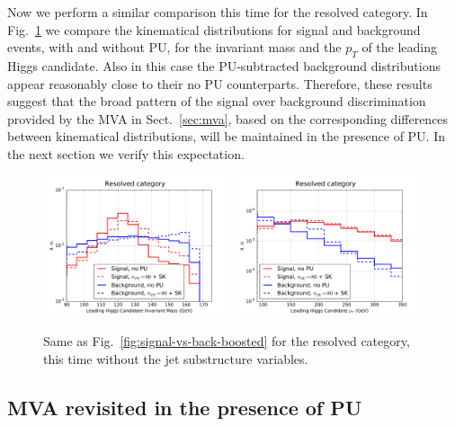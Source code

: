Now we perform a similar comparison this time for
the resolved category.
%
In Fig.~\ref{fig:signal-vs-back-resolved} we compare
the kinematical distributions for signal and background events,
     with and without PU, for the invariant mass and the $p_T$ of the leading
     Higgs candidate.
     Also in this
     case the PU-subtracted background distributions appear reasonably close
     to their no PU counterparts.
     Therefore, these results
     suggest that the broad pattern of the signal over background
     discrimination provided by the MVA in Sect.~\ref{sec:mva},
     based on the corresponding differences between kinematical
     distributions,
will
     be maintained in the presence of PU.
     In the next section we verify this expectation.


\begin{figure}[t]
  \begin{center}
   \includegraphics[width=0.49\textwidth]{plots/m_h0_res_comp_back.pdf}
  \includegraphics[width=0.49\textwidth]{plots/pt_h0_res_comp_back.pdf}
     \caption{\small
       Same as Fig.~\ref{fig:signal-vs-back-boosted} for the resolved category,
       this time without the jet substructure variables.
}
\label{fig:signal-vs-back-resolved}
\end{center}
\end{figure}

\subsection{MVA revisited in the presence of PU}

